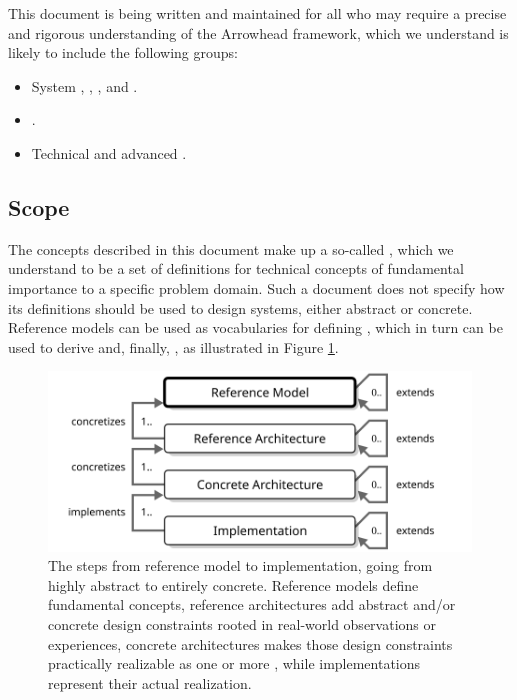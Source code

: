 This document is being written and maintained for all who may require a precise and rigorous understanding of the Arrowhead framework, which we understand is likely to include the following groups:

\begin{itemize}
\item System , , ,  and .
\item {}.
\item Technical  and advanced .
\end{itemize}

\subsection{Scope}
\label{sec:introduction:scope}

The concepts described in this document make up a so-called , which we understand to be a set of definitions for technical concepts of fundamental importance to a specific problem domain.
Such a document does not specify how its definitions should be used to design systems, either abstract or concrete.
Reference models can be used as vocabularies for defining , which in turn can be used to derive  and, finally, , as illustrated in Figure \ref{fig:reference-model}.

\begin{figure}[ht!]
  \centering
  \includegraphics[scale=0.9]{figures/reference-model}
  \caption{
    The steps from reference model to implementation, going from highly abstract to entirely concrete.
    Reference models define fundamental concepts, reference architectures add abstract and/or concrete design constraints rooted in real-world observations or experiences, concrete architectures makes those design constraints practically realizable as one or more , while implementations represent their actual realization.
  }
  \label{fig:reference-model}
\end{figure}

